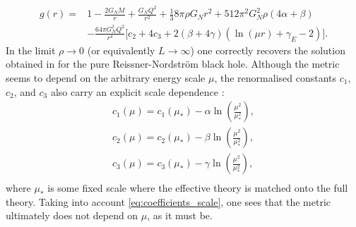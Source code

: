 \documentclass[10pt,a4paper]{article}
\begin{document}
\begin{equation}
\begin{split}
    g(r)=&1-\frac{2G_N M}{r}+\frac{G_N Q^2}{r^2}+\frac{1}{3}8\pi\rho G_N r^2+512\pi^2G^2_N\rho(4\alpha+\beta)\\&-\frac{64\pi G^2_N Q^2}{r^4}\Big[c_2+4c_3+2\left(\beta+4\gamma\right)\left(\ln\left(\mu r\right)+\gamma_E-2\right)\Big].
\end{split}
\end{equation}
In the limit $\rho\to 0$ (or equivalently $L\to\infty$) one correctly recovers the solution obtained in \cite{Delgado:2022pcc} for the pure Reissner-Nordstr\"om black hole.
Although the metric seems to depend on the arbitrary energy scale $\mu$, the renormalised constants $c_1$, $c_2$, and $c_3$ also carry an explicit scale dependence \cite{El-Menoufi:2015cqw}:
\begin{equation}\label{eq:coefficients_scale}
\begin{split}
    c_1(\mu)=c_1(\mu_*)-\alpha\ln\left(\frac{\mu^2}{\mu^2_*}\right),\\
    c_2(\mu)=c_2(\mu_*)-\beta\ln\left(\frac{\mu^2}{\mu^2_*}\right),\\
    c_3(\mu)=c_3(\mu_*)-\gamma\ln\left(\frac{\mu^2}{\mu^2_*}\right),\\
\end{split}
\end{equation}
where $\mu_*$ is some fixed scale where the effective theory is matched onto the full theory. Taking into account \eqref{eq:coefficients_scale}, one sees that the metric ultimately does not depend on $\mu$, as it must be.
\end{document}
